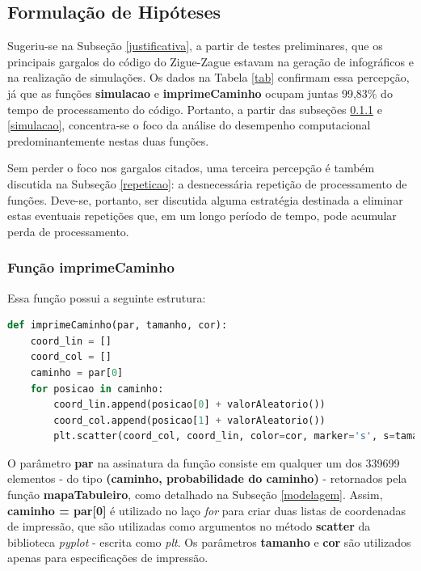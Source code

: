 \documentclass[12pt]{article}
\begin{document}
\subsection{Formulação de Hipóteses}
\label{hipoteses}


Sugeriu-se na Subseção \ref{justificativa}, a partir de testes preliminares, que os principais gargalos do código do Zigue-Zague estavam na geração de infográficos e na realização de simulações. Os dados na Tabela \ref{tab} confirmam essa percepção, já que as funções \textbf{simulacao} e \textbf{imprimeCaminho} ocupam juntas  99,83\% do tempo de processamento do código. Portanto, a partir das subseções \ref{imprime_caminho} e \ref{simulacao}, concentra-se o foco da análise do desempenho computacional predominantemente nestas duas funções.

Sem perder o foco nos gargalos citados, uma terceira percepção é também discutida na Subseção \ref{repeticao}: a desnecessária repetição de processamento de funções. Deve-se, portanto, ser discutida alguma estratégia destinada a eliminar estas eventuais repetições que, em um longo período de tempo, pode acumular perda de processamento.

\subsubsection{Função \textbf{imprimeCaminho}}
\label{imprime_caminho}

Essa função possui a seguinte estrutura:

\begin{lstlisting}[language=Python]
def imprimeCaminho(par, tamanho, cor):
	coord_lin = []
	coord_col = []
	caminho = par[0]
	for posicao in caminho:
		coord_lin.append(posicao[0] + valorAleatorio())
		coord_col.append(posicao[1] + valorAleatorio())
		plt.scatter(coord_col, coord_lin, color=cor, marker='s', s=tamanho)
\end{lstlisting}

O parâmetro \textbf{par} na assinatura da função consiste em qualquer um dos 339699 elementos - do tipo \textbf{(caminho, probabilidade do caminho)} - retornados pela função \textbf{mapaTabuleiro}, como detalhado na Subseção \ref{modelagem}. Assim, \textbf{caminho = par[0]} é utilizado no laço \textit{for} para criar duas listas de coordenadas de impressão, que são utilizadas como argumentos no método \textbf{scatter} da biblioteca \textit{pyplot} - escrita como \textit{plt}. Os parâmetros \textbf{tamanho} e \textbf{cor} são utilizados apenas para especificações de impressão.
\end{document}
